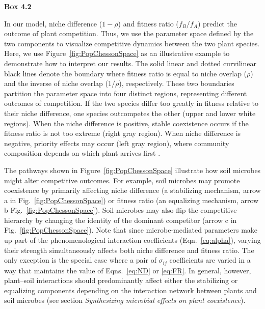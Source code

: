 \clearpage
\begin{flushleft}
	\textbf{Box 4.2}
\end{flushleft}
\begin{infobox}

In our model, niche difference ($1-\rho$) and fitness ratio ($f_{B} / f_{A}$) predict the outcome of plant competition. Thus, we use the parameter space defined by the two components to visualize competitive dynamics between the two plant species.
Here, we use Figure~\ref{fig:PopChessonSpace} as an illustrative example to demonstrate how to interpret our results. The solid linear and dotted curvilinear black lines denote the boundary where fitness ratio is equal to niche overlap ($\rho$) and the inverse of niche overlap ($1 / \rho$), respectively. These two boundaries partition the parameter space into four distinct regions, representing different outcomes of competition. If the two species differ too greatly in fitness relative to their niche difference, one species outcompetes the other (upper and lower white regions). When the niche difference is positive, stable coexistence occurs if the fitness ratio is not too extreme (right gray region). When niche difference is negative, priority effects may occur (left gray region), where community composition depends on which plant arrives first \citep{KeLetten2018}.
\par
	
	
The pathways shown in Figure~\ref{fig:PopChessonSpace} illustrate how soil microbes might alter competitive outcomes. For example, soil microbes may promote coexistence by primarily affecting niche difference (a stabilizing mechanism, arrow a in Fig.~\ref{fig:PopChessonSpace}) or fitness ratio (an equalizing mechanism, arrow b Fig.~\ref{fig:PopChessonSpace}). Soil microbes may also flip the competitive hierarchy by changing the identity of the dominant competitor (arrow c in Fig.~\ref{fig:PopChessonSpace}).
Note that since microbe-mediated parameters make up part of the phenomenological interaction coefficients (Eqn.~\ref{eq:alpha}), varying their strength simultaneously affects both niche difference and fitness ratio.
The only exception is the special case where a pair of $\sigma_{ij}$ coefficients are varied in a way that maintains the value of Eqns.~\ref{eq:ND} or \ref{eq:FR}.
In general, however, plant--soil interactions should predominantly affect either the stabilizing or equalizing components depending on the interaction network between plants and soil microbes (see section \textit{Synthesizing microbial effects on plant coexistence}).
\end{infobox}